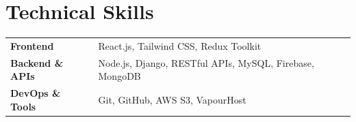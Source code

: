 \documentclass[a4paper,11pt]{article}
\begin{document}
\vspace{0pt}
\section{Technical Skills}
\begin{tabularx}{\linewidth}{@{}l X@{}}
\textbf{Frontend} & React.js, Tailwind CSS, Redux Toolkit \\[2pt]
\textbf{Backend \& APIs} & Node.js, Django, RESTful APIs, MySQL, Firebase, MongoDB \\[2pt]
\textbf{DevOps \& Tools} & Git, GitHub, AWS S3, VapourHost
\end{tabularx}

\vfill
\end{document}
